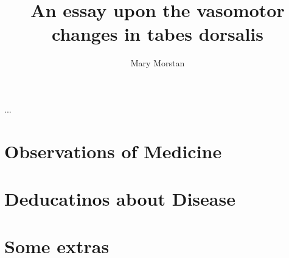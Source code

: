 \documentclass[jdecimal, citestyle=apa, 11pt]{maine-thesis}  %
\title{An essay upon the vasomotor changes in tabes dorsalis} %
\author{Mary Morstan} %
\begin{document}
\preliminary
\maketitle

\begin{abstract}
\Blindtext
\end{abstract}

\begin{layabstract}{...} %
\blindtext
\end{layabstract}

\tableofcontents

\mainmatter


\chapter{Observations of Medicine}
\blindtext

\chapter{Deducatinos about Disease}
\blindtext

\appendix %
\chapter{Some extras}
\blindtext
\end{document}
